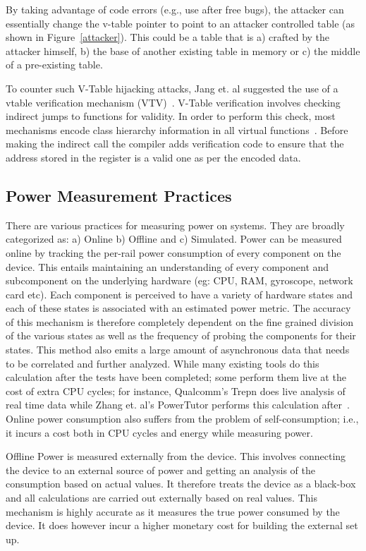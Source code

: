 \documentclass[letterpaper, 10 pt, conference]{ieeeconf}  %
\begin{document}
By taking advantage of code errors (e.g., use after free bugs), the attacker can essentially change the v-table pointer to point to an attacker controlled table (as shown in Figure~\ref{attacker}). This could be a table that is a) crafted by the attacker himself, b) the base of another existing table in memory or c) the middle of a pre-existing table.

To counter such V-Table hijacking attacks, Jang et. al suggested the use of a vtable verification mechanism (VTV)~\cite{safed}. V-Table verification involves checking indirect jumps to functions for validity. In order to perform this check, most mechanisms encode class hierarchy information in all virtual functions~\cite{vtrust}. Before making the indirect call the compiler adds verification code to ensure that the address stored in the register is a valid one as per the encoded data.

\subsection{Power Measurement Practices}
There are various practices for measuring power on systems. They are broadly categorized as: a) Online b) Offline and c) Simulated.
Power can be measured online by tracking the per-rail power consumption of every component on the device. This entails maintaining an understanding of every component and subcomponent on the underlying hardware (eg: CPU, RAM, gyroscope, network card etc). Each component is perceived to have a variety of hardware states and each of these states is associated with an estimated power metric. The accuracy of this mechanism is therefore completely dependent on the fine grained division of the various states as well as the frequency of probing the components for their states. This method also emits a large amount of asynchronous data that needs to be correlated and further analyzed. While many existing tools do this calculation after the tests have been completed; some perform them live at the cost of extra CPU cycles; for instance, Qualcomm's Trepn does live analysis of real time data while Zhang et. al's PowerTutor performs this calculation after~\cite{powertutor}. Online power consumption also suffers from the problem of self-consumption; i.e., it incurs a cost both in CPU cycles and energy while measuring power.

Offline Power is measured externally from the device. This involves connecting the device to an external source of power and getting an analysis of the consumption based on actual values. It therefore treats the device as a black-box and all calculations are carried out externally based on real values. This mechanism is highly accurate as it measures the true power consumed by the device. It does however incur a higher monetary cost for building the external set up.
\end{document}

